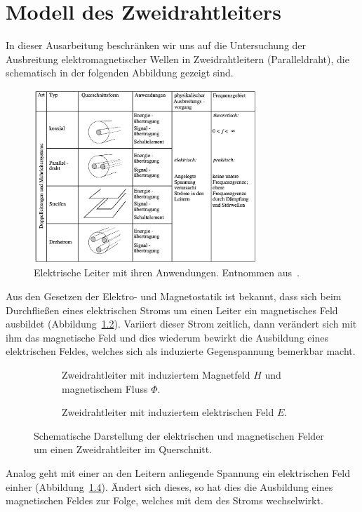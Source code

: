 \documentclass[paper=a4, parskip=half-, ngerman, fontsize=11pt]{scrreprt}
\begin{document}
\chapter{Modell des Zweidrahtleiters}

In dieser Ausarbeitung beschränken wir uns auf die Untersuchung der Ausbreitung elektromagnetischer Wellen in
Zweidrahtleitern (Paralleldraht), die schematisch in der folgenden Abbildung gezeigt sind.
\begin{figure}[!htb]
    \begin{center}
        \includegraphics[width=0.75\textwidth]{images/Leiter.png}
        \caption{Elektrische Leiter mit ihren Anwendungen. Entnommen aus~\cite{FernuniSkript}.}
        \label{Leiter}
    \end{center}
\end{figure}

Aus den Gesetzen der Elektro- und Magnetostatik ist bekannt, dass sich beim Durchfließen eines elektrischen Stroms um
einen Leiter ein magnetisches Feld ausbildet (Abbildung~\ref{Felder1}). Variiert dieser Strom zeitlich, dann
verändert sich mit ihm das magnetische Feld und dies wiederum bewirkt die Ausbildung eines elektrischen Feldes, welches
sich als induzierte Gegenspannung bemerkbar macht.
\begin{figure}[!htb]
    \begin{subfigure}[t]{0.49\textwidth}
        \centering
        
        \caption{Zweidrahtleiter mit induziertem Magnetfeld $H$ und magnetischem Fluss $\Phi$.}
        \label{Felder1}
    \end{subfigure}%
    \hfill
    \begin{subfigure}[t]{0.49\textwidth}
        \centering
        
        \caption{Zweidrahtleiter mit induziertem elektrischen Feld $E$.}
        \label{Felder2}
    \end{subfigure}
    \caption{Schematische Darstellung der elektrischen und magnetischen Felder um einen Zweidrahtleiter im Querschnitt.}
\end{figure}
Analog geht mit einer an den Leitern anliegende Spannung ein elektrischen Feld einher (Abbildung~\ref{Felder2}).
Ändert sich dieses, so hat dies die Ausbildung eines magnetischen Feldes zur Folge, welches mit dem des Stroms
wechselwirkt.
\end{document}

